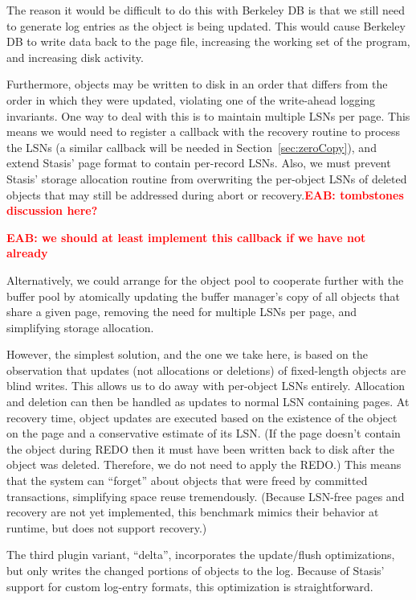 \documentclass[letterpaper,twocolumn,10pt]{article}
\newcommand{\yads}{Stasis'\xspace}
\newcommand{\eab}[1]{\textcolor{red}{\bf EAB: #1}}
\begin{document}
The reason it would be difficult to do this with Berkeley DB is that
we still need to generate log entries as the object is being updated.
  This would cause Berkeley DB to write data back to the page file,
increasing the working set of the program, and increasing disk
activity.

Furthermore, objects may be written to disk in an
order that differs from the order in which they were updated, 
violating one of the write-ahead logging invariants.  One way to 
deal with this is to maintain multiple LSNs per page.  This means we would need to register a
callback with the recovery routine to process the LSNs (a similar
callback will be needed in Section~\ref{sec:zeroCopy}), and 
extend \yads page format to contain per-record LSNs.  
Also, we must prevent \yads storage allocation routine from overwriting the per-object 
LSNs of deleted objects that may still be addressed during abort or recovery.\eab{tombstones discussion here?}  

\eab{we should at least implement this callback if we have not already}

Alternatively, we could arrange for the object pool to cooperate 
further with the buffer pool by atomically updating the buffer 
manager's copy of all objects that share a given page, removing the 
need for multiple LSNs per page, and simplifying storage allocation.

However, the simplest solution, and the one we take here, is based on
the observation that updates (not allocations or deletions) of
fixed-length objects are blind writes.  This allows us to do away with
per-object LSNs entirely.  Allocation and deletion can then be
handled as updates to normal LSN containing pages.  At recovery time,
object updates are executed based on the existence of the object on
the page and a conservative estimate of its LSN.  (If the page doesn't
contain the object during REDO then it must have been written back to
disk after the object was deleted.  Therefore, we do not need to apply
the REDO.)  This means that the system can ``forget'' about objects
that were freed by committed transactions, simplifying space reuse
tremendously.  (Because LSN-free pages and recovery are not yet
implemented, this benchmark mimics their behavior at runtime, but does
not support recovery.)

The third plugin variant, ``delta'', incorporates the update/flush
optimizations, but only writes the changed portions of
objects to the log.  Because of \yads support for custom log-entry
formats, this optimization is straightforward.
\end{document}
